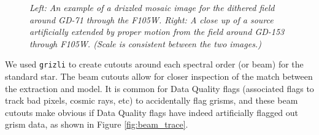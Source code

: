 \documentclass[12pt]{article}
\begin{document}
\begin{figure}[h!]
\caption{\textit{Left: An example of a drizzled mosaic image for the dithered field around GD-71 through the F105W.
    Right: A close up of a source artificially extended by proper motion from the field around GD-153 through F105W. 
    (Scale is consistent between the two images.)}}
\label{fig:mosaics}
\end{figure}

We used \texttt{grizli} to create cutouts around each spectral order (or beam) for the standard star. The
beam cutouts allow for closer inspection of the match between the extraction
and model. It is common for Data Quality flags (associated flags to track bad
pixels, cosmic rays, etc) to accidentally flag grisms, and these beam cutouts
make obvious if Data Quality flags have indeed artificially flagged out grism data, as shown in Figure 
\ref{fig:beam_trace}.
\end{document}
